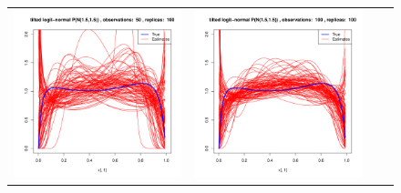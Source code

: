 \begin{figure}[h]
\begin{tabular}{cccc}
	
	\includegraphics[width=\textwidth/4]{../img/logitnormal/tilted/K2/densities/n50_R100.pdf}
	&
	\includegraphics[width=\textwidth/4]{../img/logitnormal/tilted/K2/densities/n100_R100.pdf}

\end{tabular}
\end{figure}
